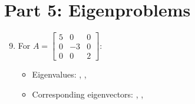 \documentclass{article}
\begin{document}
\section*{Part 5: Eigenproblems}
\begin{enumerate}
\setcounter{enumi}{8}
\item For $A = \begin{bmatrix} 5 & 0 & 0 \\ 0 & -3 & 0 \\ 0 & 0 & 2 \end{bmatrix}$:
\begin{itemize}
    \item Eigenvalues: , , 
    \item Corresponding eigenvectors: , , 
\end{itemize}


\end{enumerate}
\end{document}

